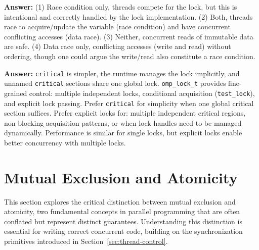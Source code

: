 \begin{ppexercises}
  
  \textbf{Answer:} (1) Race condition only, threads compete for the lock, but this is intentional and correctly handled by the lock implementation. (2) Both, threads race to acquire/update the variable (race condition) and have concurrent conflicting accesses (data race). (3) Neither, concurrent reads of immutable data are safe. (4) Data race only, conflicting accesses (write and read) without ordering, though one could argue the write/read also constitute a race condition.
  
  
  \textbf{Answer:} \texttt{critical} is simpler, the runtime manages the lock implicitly, and unnamed \texttt{critical} sections share one global lock. \texttt{omp\_lock\_t} provides fine-grained control: multiple independent locks, conditional acquisition (\texttt{test\_lock}), and explicit lock passing. Prefer \texttt{critical} for simplicity when one global critical section suffices. Prefer explicit locks for: multiple independent critical regions, non-blocking acquisition patterns, or when lock handles need to be managed dynamically. Performance is similar for single locks, but explicit locks enable better concurrency with multiple locks.
\end{ppexercises}

\section{Mutual Exclusion and Atomicity}
\label{sec:mutual-exclusion}

This section explores the critical distinction between mutual exclusion and atomicity, two fundamental concepts in parallel programming that are often conflated but represent distinct guarantees. Understanding this distinction is essential for writing correct concurrent code, building on the synchronization primitives introduced in Section~\ref{sec:thread-control}.

